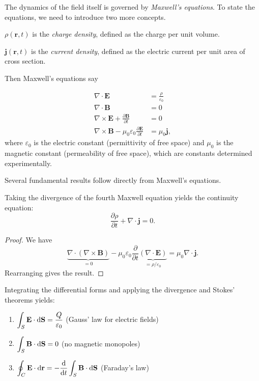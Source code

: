 \documentclass[a4paper]{article}
\begin{document}
The dynamics of the field itself is governed by \emph{Maxwell's equations}. To state the equations, we need to introduce two more concepts.

\begin{defi}
  $\rho(\mathbf{r}, t)$ is the \emph{charge density}, defined as the charge per unit volume.

  $\mathbf{j}(\mathbf{r}, t)$ is the \emph{current density}, defined as the electric current per unit area of cross section.
\end{defi}

Then Maxwell's equations say
\begin{law}
  \begin{align*}
    \nabla\cdot \mathbf{E} &= \frac{\rho}{\varepsilon_0}\\
    \nabla\cdot \mathbf{B} &= 0\\
    \nabla\times \mathbf{E} + \frac{\partial \mathbf{B}}{\partial t} &= 0\\
    \nabla\times \mathbf{B} - \mu_0\varepsilon_0 \frac{\partial \mathbf{E}}{\partial t} &= \mu_0 \mathbf{j},
  \end{align*}
  where $\varepsilon_0$ is the electric constant (permittivity of free space) and $\mu_0$ is the magnetic constant (permeability of free space), which are constants determined experimentally.
\end{law}

Several fundamental results follow directly from Maxwell's equations.

\begin{prop}
  Taking the divergence of the fourth Maxwell equation yields the continuity equation:
  \[
    \frac{\partial \rho}{\partial t} + \nabla\cdot \mathbf{j} = 0.
  \]
\end{prop}
\begin{proof}
  We have
  \[
    \underbrace{\nabla\cdot (\nabla\times \mathbf{B})}_{=0} - \mu_0\varepsilon_0\frac{\partial}{\partial t} \underbrace{(\nabla\cdot \mathbf{E})}_{=\rho/\varepsilon_0} = \mu_0 \nabla\cdot \mathbf{j}.
  \]
  Rearranging gives the result.
\end{proof}

\begin{prop}
  Integrating the differential forms and applying the divergence and Stokes' theorems yields:
  \begin{enumerate}
    \item $\displaystyle\int_S \mathbf{E}\cdot \mathrm{d} \mathbf{S} = \frac{Q}{\varepsilon_0}$ \quad (Gauss' law for electric fields)
    \item $\displaystyle\int_S \mathbf{B}\cdot \mathrm{d} \mathbf{S} = 0$ \quad (no magnetic monopoles)
    \item $\displaystyle\oint_C \mathbf{E}\cdot \mathrm{d} \mathbf{r} = -\frac{\mathrm{d} }{\mathrm{d} t}\int_S \mathbf{B}\cdot \mathrm{d} \mathbf{S}$ \quad (Faraday's law)
  \end{enumerate}
\end{prop}
\end{document}
